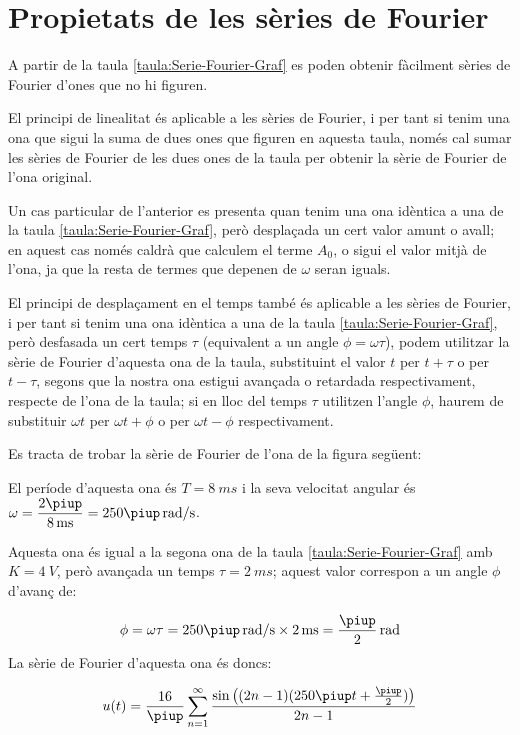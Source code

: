 \section{Propietats de les sèries de Fourier}

A partir de la taula \vref{taula:Serie-Fourier-Graf} es poden obtenir fàcilment sèries de Fourier d'ones que no hi figuren.

El principi de linealitat és aplicable a les sèries de Fourier, i per tant si tenim una ona que sigui la suma de dues ones que figuren en aquesta taula, només  cal sumar les sèries de Fourier de les dues ones de la taula per obtenir la sèrie de Fourier de l'ona original.

Un cas particular de l'anterior es presenta quan tenim una ona  idèntica a una de la taula \ref{taula:Serie-Fourier-Graf}, però desplaçada un cert valor amunt o avall; en aquest cas només caldrà que calculem el terme $A_0$, o sigui el valor mitjà de l'ona, ja que la resta de termes que depenen de $\omega$ seran iguals.

El principi de desplaçament en el temps també és aplicable a les sèries de Fourier, i per tant si tenim una ona idèntica a una de la taula \ref{taula:Serie-Fourier-Graf}, però desfasada un cert temps $\tau$ (equivalent a un angle $\phi = \omega \tau$), podem utilitzar la sèrie de Fourier d'aquesta ona de la taula, substituint el valor $t$ per $t+\tau$ o per $t-\tau$, segons que la nostra ona estigui avançada o retardada respectivament, respecte de l'ona de la taula; si en lloc del temps $\tau$ utilitzen l'angle $\phi$, haurem de substituir  $\omega t$ per $\omega t + \phi$ o per $\omega t - \phi$ respectivament.


\begin{exemple}
    Es tracta de trobar la sèrie de Fourier de l'ona de la figura següent:
    \begin{center}
        
    \end{center}

    El període d'aquesta ona és $T=\qty{8}{ms}$ i la seva velocitat angular és $\omega = \dfrac{2\piup}{\qty{8}{ms}} = 250 \piup\unit{\,rad/s}$.

    Aquesta ona és igual a la segona ona de la taula \vref{taula:Serie-Fourier-Graf} amb $K=\qty{4}{V}$, però avançada un temps $\tau=\qty{2}{ms}$; aquest valor correspon a un angle $\phi$ d'avanç de:

    \[
        \phi = \omega \tau = 250\piup\unit{\,rad/s} \times \qty{2}{ms} = \frac{\piup}{2}\unit{\,rad}
    \]
    La sèrie de Fourier d'aquesta ona és doncs:

    \[
    u(t) = \frac{{16}}{\piup }\sum\limits_{n = 1}^\infty  {\frac{{\sin \big((2n - 1)(250\piup t+ \frac{\piup}{2})\big)}}{{2n - 1}}}
    \]
\end{exemple}

